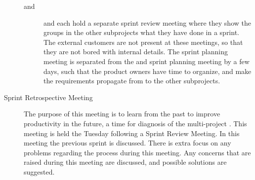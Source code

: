 \begin{description}
\begin{description}
    \item[\db and \bd] \db and \bd each hold a separate sprint review meeting where they show the groups in the other subprojects what they have done in a sprint. The external customers are not present at these meetings, so that they are not bored with internal details. The \gui sprint planning meeting is separated from the \db and \bd sprint planning meeting by a few days, such that the product owners have time to organize, and make the requirements propagate from \gui to the other subprojects.
  \end{description}
  \item[Sprint Retrospective Meeting]  The purpose of this meeting is to learn from the past to improve productivity in the future, a time for diagnosis of the multi-project \cite{scrumChecklist}. This meeting is held the Tuesday following a Sprint Review Meeting. In this meeting the previous sprint is discussed. There is extra focus on any problems regarding the process during this meeting. Any concerns that are raised during this meeting are discussed, and possible solutions are suggested.
\end{description}


